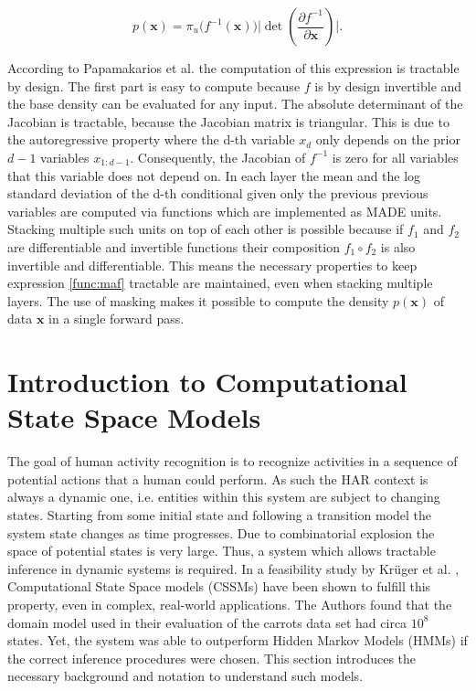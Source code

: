 \documentclass[11pt,titlepage,oneside,openany]{book}
\begin{document}
\begin{equation}
	\label{func:maf}
	p(\pmb{x}) = \pi_{u} \bigl(f^{-1}(\pmb{x})\bigr) \biggl\lvert \det \left(\frac{\partial f^{-1}}{\partial \pmb{x}} \right) \biggr\rvert.
\end{equation}

\noindent According to Papamakarios et al. \cite{papamakarios_masked_2017} the computation of this expression is tractable by design. The first part is easy to compute because $f$ is by design invertible and the base density can be evaluated for any input. The absolute determinant of the Jacobian is tractable, because the Jacobian matrix is triangular. This is due to the autoregressive property where the d-th variable $x_d$ only depends on the prior $d-1$ variables $x_{1:d-1}$. Consequently, the Jacobian of $f^{-1}$ is zero for all variables that this variable does not depend on. %
In each layer the mean and the log standard deviation of the d-th conditional given only the previous previous variables are computed via functions which are implemented as MADE units. Stacking multiple such units on top of each other is possible because if $f_1$ and $f_2$ are differentiable and invertible functions their composition $f_1 \circ f_2$ is also invertible and differentiable. This means the necessary properties to keep expression \ref{func:maf} tractable are maintained, even when stacking multiple layers. The use of masking makes it possible to compute the density $p(\pmb{x})$ of data $\pmb{x}$ in a single forward pass.

\section{Introduction to Computational State Space Models}
\label{sec:cssm}
The goal of human activity recognition is to recognize activities in a sequence of potential actions that a human could perform. As such the HAR context is always a dynamic one, i.e. entities within this system are subject to changing states. Starting from some initial state and following a transition model the system state changes as time progresses. Due to combinatorial explosion the space of potential states is very large. Thus, a system which allows tractable inference in dynamic systems is required. In a feasibility study by Kr\"uger et al.  \cite{kruger_computational_2014}, Computational State Space models (CSSMs) have been shown to fulfill this property, even in complex, real-world applications. The Authors found that the domain model used in their evaluation of the carrots data set had circa $10^8$ states. Yet, the system was able to outperform Hidden Markov Models (HMMs) if the correct inference procedures were chosen. This section introduces the necessary background and notation to understand such models.
\end{document}
